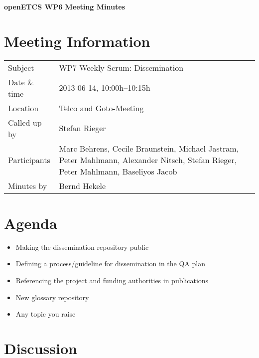 \documentclass[a4paper, 11pt]{article}
\begin{document}
{\begin{center}\huge\bf openETCS WP6 Meeting Minutes\end{center}}
\section{Meeting Information}

\renewcommand{\arraystretch}{1.5}
\begin{supertabular}{m{.2\textwidth}m{.8\textwidth}}
Subject & WP7 Weekly Scrum: Dissemination\\
Date \& time & 2013-06-14, 10:00h--10:15h\\
Location & Telco and Goto-Meeting\\
Called up by & Stefan Rieger\\
Participants &
Marc Behrens,
Cecile Braunstein,
Michael Jastram,
Peter Mahlmann,
Alexander Nitsch,
Stefan Rieger,
Peter Mahlmann,
Baseliyos Jacob
\\

Minutes by & Bernd Hekele\\

\end{supertabular}
\renewcommand{\arraystretch}{1.0}


\section{Agenda}
\begin{itemize}
\item Making the dissemination repository public 
\item Defining a process/guideline for dissemination in the QA plan 
\item Referencing the project and funding authorities in publications 
\item New glossary repository 
\item Any topic you raise 
\end{itemize}

\section{Discussion}
\end{document}
